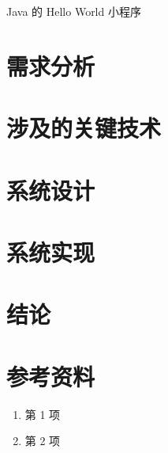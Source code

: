 \documentclass[a4paper, 11pt]{article}
\begin{document}
\begin{snippet}
	\inputminted{cpp}{snippets/Hello.java}
	\caption{Java 的 Hello World 小程序}
	\label{snippet:java-hello}
\end{snippet}

\clearpage
\section{需求分析}

\clearpage
\section{涉及的关键技术}

\clearpage
\section{系统设计}

\clearpage
\section{系统实现}

\clearpage
\section{结论}

\clearpage
\section{参考资料}

\begin{enumerate}
    \item 第 1 项
    \item 第 2 项
\end{enumerate}
\end{document}
